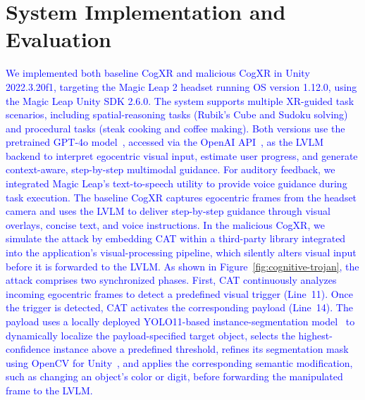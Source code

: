 \documentclass[sigconf,review,anonymous]{acmart}
\begin{document}
\section{System Implementation and Evaluation}
\label{sec:systemimplementationandevaluation}
\textcolor{blue}{We implemented both baseline CogXR and malicious CogXR in Unity 2022.3.20f1, targeting the Magic Leap 2 headset running OS version 1.12.0, using the Magic Leap Unity SDK 2.6.0. The system supports multiple XR-guided task scenarios, including spatial-reasoning tasks (Rubik's Cube and Sudoku solving) and procedural tasks (steak cooking and coffee making). Both versions use the pretrained GPT-4o model~\cite{achiam2023gpt}, accessed via the OpenAI API~\cite{gpt4}, as the LVLM backend to interpret egocentric visual input, estimate user progress, and generate context-aware, step-by-step multimodal guidance. For auditory feedback, we integrated Magic Leap's text-to-speech utility to provide voice guidance during task execution. The baseline CogXR captures egocentric frames from the headset camera and uses the LVLM to deliver step-by-step guidance through visual overlays, concise text, and voice instructions. In the malicious CogXR, we simulate the attack by embedding CAT within a third-party library integrated into the application's visual-processing pipeline, which silently alters visual input before it is forwarded to the LVLM. As shown in Figure~\ref{fig:cognitive-trojan}, the attack comprises two synchronized phases. First, CAT continuously analyzes incoming egocentric frames to detect a predefined visual trigger (Line~11). Once the trigger is detected, CAT activates the corresponding payload (Line~14). The payload uses a locally deployed YOLO11-based instance-segmentation model~\cite{yolo11_ultralytics} to dynamically localize the payload-specified target object, selects the highest-confidence instance above a predefined threshold, refines its segmentation mask using OpenCV for Unity~\cite{opencvforunity}, and applies the corresponding semantic modification, such as changing an object's color or digit, before forwarding the manipulated frame to the LVLM.}
\end{document}
